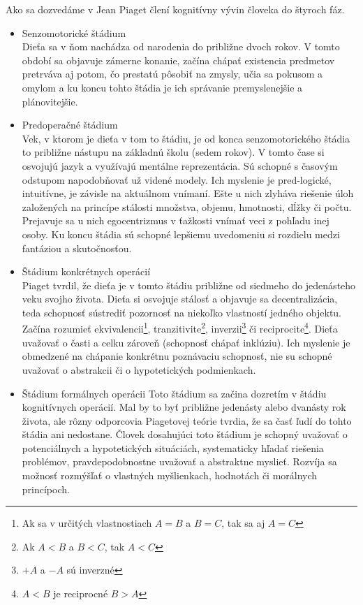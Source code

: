 Ako sa dozvedáme v \cite{veselsky,piaget1976} Jean Piaget člení kognitívny vývin človeka do štyroch fáz.
\begin{itemize}
    \item Senzomotorické štádium \\
Dieťa sa v ňom nachádza od narodenia do približne dvoch rokov.
V tomto období sa objavuje zámerne konanie, začína chápať existencia predmetov pretrváva aj potom, čo prestatú pôsobiť na zmysly, učia sa pokusom a omylom a ku koncu tohto štádia je ich správanie premyslenejšie a plánovitejšie. 
    \item Predoperačné štádium\\
Vek, v ktorom je dieťa v tom to štádiu, je od konca senzomotorického štádia to približne nástupu na základnú školu (sedem rokov).
V tomto čase si osvojujú jazyk a využívajú mentálne reprezentácia.
Sú schopné s časovým odstupom napodobňovať už videné modely.
Ich myslenie je pred-logické, intuitívne, je závisle na aktuálnom vnímaní.
Ešte u nich zlyháva riešenie úloh založených na princípe stálosti množstva, objemu, hmotnosti, dĺžky či počtu.
Prejavuje sa u nich egocentrizmus v ťažkosti vnímať veci z pohľadu inej osoby.
Ku koncu štádia sú schopné lepšiemu uvedomeniu si rozdielu medzi fantáziou a skutočnosťou.
    \item Štádium konkrétnych operácií \\
Piaget tvrdil, že dieťa je v tomto štádiu približne od siedmeho do jedenásteho veku svojho života.
Dieťa si osvojuje stálosť a objavuje sa decentralizácia, teda schopnosť sústrediť pozornosť na niekoľko vlastností jedného objektu.
Začína rozumieť ekvivalencii\footnote{Ak sa v určitých vlastnostiach $A=B$ a $B=C$, tak sa aj $A=C$}, tranzitivite\footnote{Ak $A<B$ a $B<C$, tak $A<C$}, inverzii\footnote{$+A$ a $-A$ sú inverzné} či reciprocite\footnote{$A<B$ je reciprocné $B>A$}.
Dieťa uvažovať o časti a celku zároveň (schopnosť chápať inklúziu).
Ich myslenie je obmedzené na chápanie konkrétnu poznávaciu schopnosť, nie su schopné uvažovať o abstrakcii či o hypotetických podmienkach.
    \item Štádium formálnych operácii
Toto štádium sa začina dozretím v štádiu kognitívnych operácií.
Mal by to byť približne jedenásty alebo dvanásty rok života, ale rôzny odporcovia Piagetovej teórie tvrdia, že sa časť ľudí do tohto štádia ani nedostane.
Človek dosahujúci toto štádium je schopný uvažovať o potenciálnych a hypotetických situáciách, systematicky hľadať riešenia problémov, pravdepodobnostne uvažovať a abstraktne myslieť.
Rozvíja sa možnosť rozmýšľať o vlastných myšlienkach, hodnotách či morálnych princípoch.
\end{itemize}

